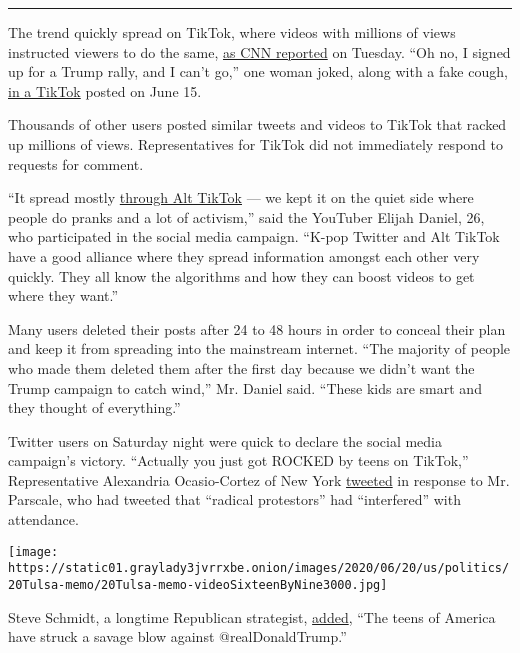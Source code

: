 \begin{center}\rule{0.5\linewidth}{\linethickness}\end{center}

The trend quickly spread on TikTok, where videos with millions of views
instructed viewers to do the same,
\href{https://www.cnn.com/2020/06/16/politics/tiktok-trump-tulsa-rally-trnd/index.html}{as
CNN reported} on Tuesday. ``Oh no, I signed up for a Trump rally, and I
can't go,'' one woman joked, along with a fake cough,
\href{https://www.tiktok.com/@proloser12245/video/6838621598229056773}{in
a TikTok} posted on June 15.

Thousands of other users posted similar tweets and videos to TikTok that
racked up millions of views. Representatives for TikTok did not
immediately respond to requests for comment.

``It spread mostly
\href{https://www.nytimes3xbfgragh.onion/2020/06/10/style/elite-tiktok.html}{through
Alt TikTok} --- we kept it on the quiet side where people do pranks and
a lot of activism,'' said the YouTuber Elijah Daniel, 26, who
participated in the social media campaign. ``K-pop Twitter and Alt
TikTok have a good alliance where they spread information amongst each
other very quickly. They all know the algorithms and how they can boost
videos to get where they want.''

Many users deleted their posts after 24 to 48 hours in order to conceal
their plan and keep it from spreading into the mainstream internet.
``The majority of people who made them deleted them after the first day
because we didn't want the Trump campaign to catch wind,'' Mr. Daniel
said. ``These kids are smart and they thought of everything.''

Twitter users on Saturday night were quick to declare the social media
campaign's victory. ``Actually you just got ROCKED by teens on TikTok,''
Representative Alexandria Ocasio-Cortez of New York
\href{https://twitter.com/AOC/status/1274499021625794565?s=20}{tweeted}
in response to Mr. Parscale, who had tweeted that ``radical protestors''
had ``interfered'' with attendance.

\texttt{[image: https://static01.graylady3jvrrxbe.onion/images/2020/06/20/us/politics/20Tulsa-memo/20Tulsa-memo-videoSixteenByNine3000.jpg]}

Steve Schmidt, a longtime Republican strategist,
\href{https://twitter.com/SteveSchmidtSES/status/1274486428160811009}{added},
``The teens of America have struck a savage blow against
@realDonaldTrump.''

